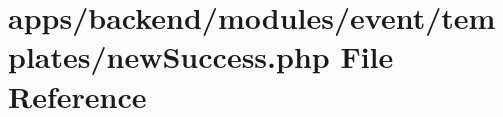 \hypertarget{backend_2modules_2event_2templates_2new_success_8php}{\section{apps/backend/modules/event/templates/new\-Success.php File Reference}
\label{backend_2modules_2event_2templates_2new_success_8php}
}
